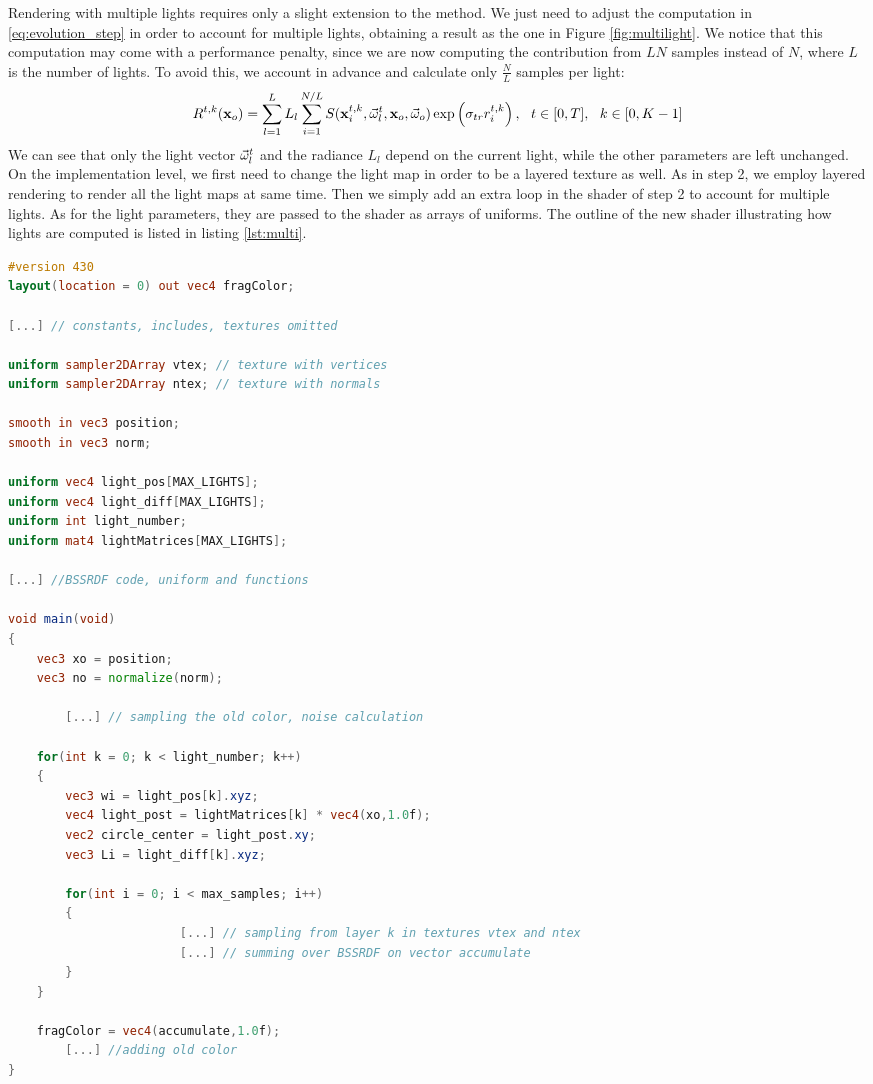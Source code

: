 Rendering with multiple lights requires only a slight extension to the method. We just need to adjust the computation in \ref{eq:evolution_step} in order to account for multiple lights, obtaining a result as the one in Figure \ref{fig:multilight}. We notice that this computation may come with a performance penalty, since we are now computing the contribution from $L N$ samples instead of $N$, where $L$ is the number of lights. To avoid this, we account in advance and calculate only $\frac{N}{L}$ samples per light:
$$
R^{t,k}(\x_o) = \sum_{l = 1}^L L_l \sum_{i = 1}^{N/L} S(\x^{t,k}_i, \vomega^t_l, \x_o, \vomega_o) \exp\left(\sigma_{tr} r^{t,k}_i\right), \ \ t \in [0,T], \ \ k \in [0,K-1] 
$$
We can see that only the light vector $\vec{\omega}^t_l$ and the radiance $L_l$ depend on the current light, while the other parameters are left unchanged. On the implementation level, we first need to change the light map in order to be a layered texture as well. As in step 2, we employ layered rendering to render all the light maps at same time. Then we simply add an extra loop in the shader of step 2 to account for multiple lights. As for the light parameters, they are passed to the shader as arrays of uniforms. The outline of the new shader illustrating how lights are computed is listed in listing \ref{lst:multi}.

\begin{lstlisting}[language=GLSL,label=lst:multi,caption={Outline of the shader in step 2 with support for multiple lights.}]
#version 430
layout(location = 0) out vec4 fragColor;

[...] // constants, includes, textures omitted

uniform sampler2DArray vtex; // texture with vertices
uniform sampler2DArray ntex; // texture with normals

smooth in vec3 position;
smooth in vec3 norm;

uniform vec4 light_pos[MAX_LIGHTS];
uniform vec4 light_diff[MAX_LIGHTS];
uniform int light_number;
uniform mat4 lightMatrices[MAX_LIGHTS];

[...] //BSSRDF code, uniform and functions

void main(void)
{
    vec3 xo = position;
    vec3 no = normalize(norm);

		[...] // sampling the old color, noise calculation

    for(int k = 0; k < light_number; k++)
    {
        vec3 wi = light_pos[k].xyz;
        vec4 light_post = lightMatrices[k] * vec4(xo,1.0f);
        vec2 circle_center = light_post.xy;
        vec3 Li = light_diff[k].xyz;
				
        for(int i = 0; i < max_samples; i++)
        {
						[...] // sampling from layer k in textures vtex and ntex
						[...] // summing over BSSRDF on vector accumulate
        }
    }

    fragColor = vec4(accumulate,1.0f);
		[...] //adding old color
}
\end{lstlisting}
\clearpage
